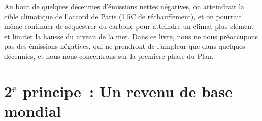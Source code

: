 \documentclass[a5paper,french,openany]{memoir}
\begin{document}
Au bout de quelques décennies d'émissions nettes négatives, on atteindrait la cible climatique de l'accord de Paris (1,5\textdegree{}C de réchauffement), et on pourrait même continuer de séquestrer du carbone pour atteindre un climat plus clément et limiter la hausse du niveau de la mer. Dans ce livre, nous ne nous préoccupons pas des émissions négatives, qui ne prendront de l'ampleur que dans quelques décennies, et nous nous concentrons sur la première phase du Plan. 

\section{2$^\text{e}$ principe~: Un revenu de base mondial}\label{pcp:rdb}
\end{document}
